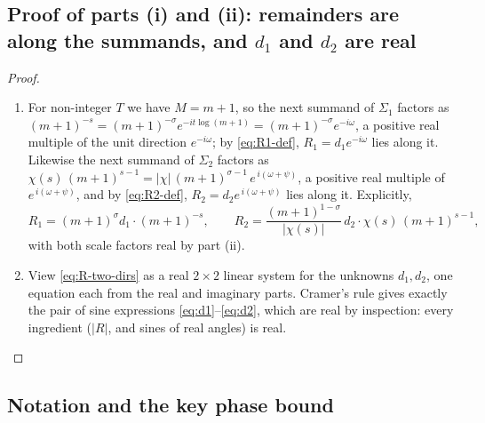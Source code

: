 \documentclass[11pt]{article}
\theoremstyle{definition}
\begin{document}
\subsection{Proof of parts (i) and (ii): remainders are along the summands, and \texorpdfstring{$d_1$ and $d_2$}{d1 and d2} are real}\label{sec:proof-i-ii}

\begin{proof}
\begin{enumerate}
\item[(i)] For non-integer $T$ we have $M=m+1$, so the next
summand of $\Sigma_1$ factors as
$(m+1)^{-s}=(m+1)^{-\sigma}e^{-it\log(m+1)}=(m+1)^{-\sigma}e^{-i\omega}$,
a positive real multiple of the unit direction $e^{-i\omega}$; by
\eqref{eq:R1-def}, $R_1=d_1e^{-i\omega}$ lies along it. Likewise the next
summand of $\Sigma_2$ factors as $\chi(s)\,(m+1)^{s-1}
=|\chi|\,(m+1)^{\sigma-1}\,e^{\,i(\omega+\psi)}$, a positive real multiple
of $e^{\,i(\omega+\psi)}$, and by \eqref{eq:R2-def},
$R_2=d_2e^{\,i(\omega+\psi)}$ lies along it. Explicitly,
\[
R_1=(m+1)^{\sigma}d_1\cdot(m+1)^{-s},
\qquad
R_2=\frac{(m+1)^{1-\sigma}}{|\chi(s)|}\,d_2\cdot\chi(s)\,(m+1)^{s-1},
\]
with both scale factors real by part (ii).
\item[(ii)] View \eqref{eq:R-two-dirs} as a real $2\times2$ linear
system for the unknowns $d_1,d_2$, one equation each from the real and
imaginary parts. Cramer's rule gives exactly the pair of sine expressions
\eqref{eq:d1}--\eqref{eq:d2}, which are real by inspection: every
ingredient ($|R|$, and sines of real angles) is real. \qedhere
\end{enumerate}
\end{proof}

\subsection{Notation and the key phase bound}\label{sec:phase-bound}
\end{document}
